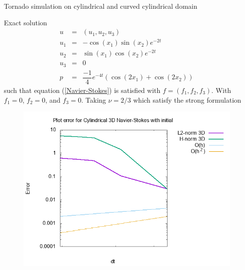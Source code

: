 \documentclass{beamer}
\begin{document}
\begin{frame}{Tornado simulation on cylindrical and curved cylindrical domain}
\begin{block}{Exact solution}
	\begin{eqnarray}\nonumber
	u &=& (u_{1},u_{2},u_{3}) \\ \nonumber
	u_{1} &=& -\cos(x_{1}) \sin(x_{2}) e^{-2t}\\ \nonumber
	u_{2} &=& \sin(x_{1}) \cos(x_{2}) e^{-2t}\\ \nonumber
	u_{3} &=& 0 \\ \nonumber
	p&=& \dfrac{-1}{4} e^{-4t} (\cos(2x_1)+\cos(2x_2))
	\end{eqnarray}
	such that equation (\ref{Navier-Stokes}) is satisfied with $ f = (f_{1},f_{2},f_3) $. With $ f_{1} =0 $, $ f_{2} = 0  $, and $ f_{3} = 0  $. Taking $ \nu=2/3 $ which satisfy the strong formulation
\end{block}
\end{frame}

\begin{frame}
\begin{figure}
	\centering
	\includegraphics[width=0.9\linewidth]{NS_3D/error_tornado}
	\caption{}
	\label{fig:errortornado}
\end{figure}
\end{frame}
\end{document}
